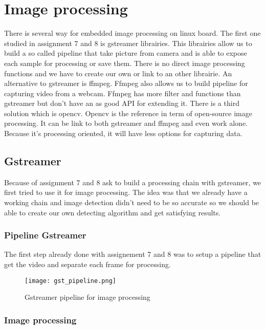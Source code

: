 \newpage
\section{Image processing}

There is several way for embedded image processing on linux board. The first one studied in assignment 7 and 8 is gstreamer librairies. This librairies allow us to build a so called pipeline that take picture from camera and is able to expose each sample for processing or save them. There is no direct image processing functions and we have to create our own or link to an other librairie. An alternative to gstreamer is ffmpeg. Ffmpeg also allows us to build pipeline for capturing video from a webcam. Ffmpeg has more filter and functions than gstreamer but don't have an as good API for extending it. There is a third solution which is opencv. Opencv is the reference in term of open-source image processing. It can be link to both gstreamer and ffmpeg and even work alone. Because it's processing oriented, it will have less options for capturing data. 

\subsection{Gstreamer }

Because of assignment 7 and 8 ask to build a processing chain with gstreamer, we first tried to use it for image processing. The idea was that we already have a working chain and image detection didn't need to be so accurate so we should be able to create our own detecting algorithm and get satisfying results.

\subsubsection{Pipeline Gstreamer}
The first step already done with assignement 7 and  8 was to setup a pipeline that get the video and separate each frame for processing. 

\begin{figure}[!ht]
\centering
 \texttt{[image: gst\_pipeline.png]}
 \caption{Gstreamer pipeline for image processing}
 \label{gst_pip}
\end{figure}

\subsubsection{Image processing}

